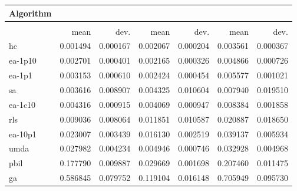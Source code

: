 \begin{tabular}{@{} l *{6}{>{{}}N{1}{2}} @{}}
\toprule
{Algorithm} &  \\
\midrule
&  &  &  \\
\midrule
& {mean} & {dev.} & {mean} & {dev.} & {mean} & {dev.} \\
\midrule
hc & 0.001494 & 0.000167 & 0.002067 & 0.000204 & 0.003561 & 0.000367 \\
ea-1p10 & 0.002701 & 0.000401 & 0.002165 & 0.000326 & 0.004866 & 0.000726 \\
ea-1p1 & 0.003153 & 0.000610 & 0.002424 & 0.000454 & 0.005577 & 0.001021 \\
sa & 0.003616 & 0.008907 & 0.004325 & 0.010604 & 0.007940 & 0.019510 \\
ea-1c10 & 0.004316 & 0.000915 & 0.004069 & 0.000947 & 0.008384 & 0.001858 \\
rls & 0.009036 & 0.008064 & 0.011851 & 0.010587 & 0.020887 & 0.018650 \\
ea-10p1 & 0.023007 & 0.003439 & 0.016130 & 0.002519 & 0.039137 & 0.005934 \\
umda & 0.027982 & 0.004234 & 0.004946 & 0.000746 & 0.032928 & 0.004968 \\
pbil & 0.177790 & 0.009887 & 0.029669 & 0.001698 & 0.207460 & 0.011475 \\
ga & 0.586845 & 0.079752 & 0.119104 & 0.016148 & 0.705949 & 0.095730 \\
\bottomrule
\end{tabular}
